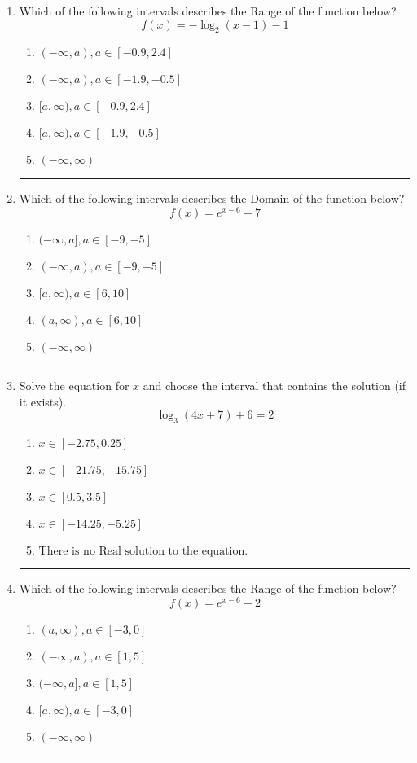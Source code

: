 \documentclass[14pt]{extbook}
\newcommand{\litem}[1]{\item#1\hspace*{-1cm}\rule{\textwidth}{0.4pt}}
\begin{document}
\begin{enumerate}
{\begin{enumerate}[label=\Alph*.]
\end{enumerate} }
\litem{
Which of the following intervals describes the Range of the function below?\[ f(x) = -\log_2{(x-1)}-1 \]\begin{enumerate}[label=\Alph*.]
\item \( (-\infty, a), a \in [-0.9, 2.4] \)
\item \( (-\infty, a), a \in [-1.9, -0.5] \)
\item \( [a, \infty), a \in [-0.9, 2.4] \)
\item \( [a, \infty), a \in [-1.9, -0.5] \)
\item \( (-\infty, \infty) \)

\end{enumerate} }
\litem{
Which of the following intervals describes the Domain of the function below?\[ f(x) = e^{x-6}-7 \]\begin{enumerate}[label=\Alph*.]
\item \( (-\infty, a], a \in [-9, -5] \)
\item \( (-\infty, a), a \in [-9, -5] \)
\item \( [a, \infty), a \in [6, 10] \)
\item \( (a, \infty), a \in [6, 10] \)
\item \( (-\infty, \infty) \)

\end{enumerate} }
\litem{
Solve the equation for $x$ and choose the interval that contains the solution (if it exists).\[ \log_{3}{(4x+7)}+6 = 2 \]\begin{enumerate}[label=\Alph*.]
\item \( x \in [-2.75, 0.25] \)
\item \( x \in [-21.75, -15.75] \)
\item \( x \in [0.5, 3.5] \)
\item \( x \in [-14.25, -5.25] \)
\item \( \text{There is no Real solution to the equation.} \)

\end{enumerate} }
\litem{
Which of the following intervals describes the Range of the function below?\[ f(x) = e^{x-6}-2 \]\begin{enumerate}[label=\Alph*.]
\item \( (a, \infty), a \in [-3, 0] \)
\item \( (-\infty, a), a \in [1, 5] \)
\item \( (-\infty, a], a \in [1, 5] \)
\item \( [a, \infty), a \in [-3, 0] \)
\item \( (-\infty, \infty) \)


\end{enumerate}}
\end{enumerate}
\end{document}
